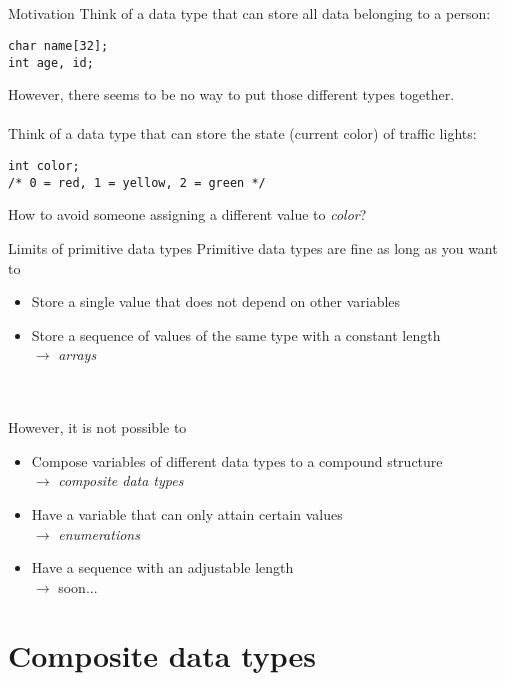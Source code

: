 \subsection{}
\begin{frame}[fragile]{Motivation}
	Think of a data type that can store all data belonging to a person:
	\begin{lstlisting}[numbers=none]
char name[32];
int age, id;
\end{lstlisting}
	However, there seems to be no way to put those different types together.\\ \ \\
	Think of a data type that can store the state (current color) of traffic lights:
	\begin{lstlisting}[numbers=none]
int color;
/* 0 = red, 1 = yellow, 2 = green */
\end{lstlisting}
	How to avoid someone assigning a different value to \textit{color}?
\end{frame}
\begin{frame}{Limits of primitive data types}
	Primitive data types are fine as long as you want to
	\begin{itemize}
		\item Store a single value that does not depend on other variables
		\item Store a sequence of values of the same type with a constant length \\
		$\rightarrow$ \textit{arrays}
	\end{itemize} \ \\ \ \\
	However, it is not possible to
	\begin{itemize}
		\item Compose variables of different data types to a compound structure \\
		$\rightarrow$ \textit{composite data types}
		\item Have a variable that can only attain certain values \\
		$\rightarrow$ \textit{enumerations}
		\item Have a sequence with an adjustable length \\
		$\rightarrow$ soon...
	\end{itemize}
\end{frame}

\section{Composite data types}

